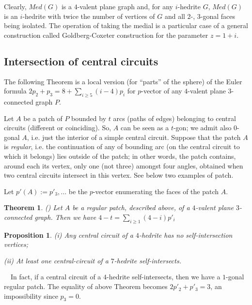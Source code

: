 \documentclass[12pt]{article}
\newtheorem{proposition}{Proposition}
\newtheorem{theor}{Theorem}
\newcommand{\proof}{\noindent{\bf Proof.}\ \ }
\begin{document}
Clearly, $Med(G)$ is a $4$-valent plane graph and, for any $i$-hedrite $G$, $Med(G)$ is an $i$-hedrite with twice the number of vertices of $G$ and all $2$-, $3$-gonal faces being isolated. The operation of taking the medial is a particular case of a general construction called Goldberg-Coxeter construction for the parameter $z=1+i$.





\subsection{Intersection of central circuits}

The following Theorem is a local version (for ``parts'' of the sphere) of
the Euler formula
$2p_2+p_3=8+ \sum_{i\geq 5} (i-4)p_i$ for $p$-vector of any $4$-valent 
plane $3$-connected graph $P$.

Let $A$ be a patch of $P$ bounded by $t$ arcs (paths of edges) belonging to 
central circuits (different or coinciding). So, $A$ can be seen as a 
$t$-gon; we admit also $0$-gonal $A$, i.e.
just the interior of a simple central circuit. Suppose that the patch $A$ is
{\em regular}, i.e.
the continuation of any of bounding arc (on the central circuit to which it
belongs) lies outside of the patch; in other words, the patch
contains, around each its vertex, only one (not three) amongst four angles, 
obtained when two central circuits intersect in this vertex.  See below two 
examples of patch.

\begin{center}
\epsfxsize=60mm
\end{center}

Let $p'(A):=p'_3,...$ be the $p$-vector enumerating the faces of the patch $A$. 

\begin{theor} \label{Local-Euler-Formula}(\cite{DSt})
Let $A$ be a regular patch, described above, of a $4$-valent plane
$3$-connected graph. Then we have $4-t=\sum_{i\geq 1} (4-i)p'_i$
\end{theor}



\begin{proposition}
(i) Any central circuit of a $4$-hedrite has no self-intersection vertices;

(ii) At least one central-circuit of a $7$-hedrite self-intersects.
\end{proposition}
\proof In fact, if a central circuit of a $4$-hedrite self-intersects, then we have a $1$-gonal regular patch. The equality of above Theorem becomes $2p'_2+p'_3=3$, an impossibility since $p_3=0$.
\end{document}
